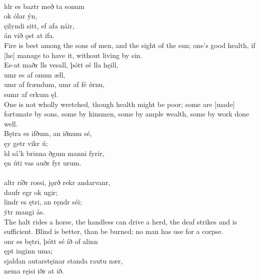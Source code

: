  \\

\bva {}ldr es baztr \hld með ta sonum \\%
\ind ok ólar ýn, \\%
ęilyndi sitt, \hld ef afa náir, \\%
\ind án við ǫst at ifa.\\%

\bvb Fire is best among the sons of men, and the sight of the sun; one's good health, if [he] manage to have it, without living by sin. \\

\bva Es-at maðr lls vesall, \hld þótt sé lla hęill, \\%
\ind {}umr es af onum æll, \\%
umr af frændum, \hld {}umr af fé ǿrnu, \\%
\ind sumr af erkum ęl.\\%

\bvb One is not wholly wretched, though health might be poor; some are [made] fortunate by sons, some by kinsmen, some by ample wealth, some by work done well. \\

\bva Bętra es ifðum, \hld an iðnum sé, \\%
\ind ęy getr vikr ú; \\%
ld sá'k brinna \hld {}ðgum manni fyrir, \\%
\ind ęn úti vas auðr fyr urum.\\%

 \\

\bva {}altr ríðr rossi, \hld {}jǫrð rekr andarvanr, \\%
\ind daufr egr ok ugir; \\%
lindr es ętri, \hld an ręndr séi; \\%
\ind {}ýtr mangi ás.\\%

\bvb The halt rides a horse, the handless can drive a herd, the deaf strikes and is sufficient. Blind is better, than be burned; no man has use for a corpse. \\

\bva {}onr es bętri, \hld þótt sé íð of alinn \\%
\ind ępt inginn uma; \\%
sjaldan autarstęinar \hld standa rautu nær, \\%
\ind nema ręisi iðr at ið.\\%

